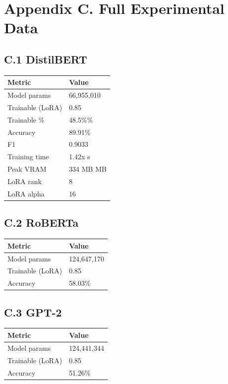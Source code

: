 \section{Appendix C. Full Experimental Data}

\subsection{C.1 DistilBERT}

\begin{table}[H]
\centering
\small
\begin{tabular}{ll}
\toprule
\textbf{Metric} & \textbf{Value} \\
\midrule
Model params & 66,955,010 \\
Trainable (LoRA) & 0.85 \\
Trainable \% & 48.5\%\% \\
Accuracy & 89.91\% \\
F1 & 0.9033 \\
Training time & 1.42x s \\
Peak VRAM & 334 MB MB \\
LoRA rank & 8 \\
LoRA alpha & 16 \\
\bottomrule
\end{tabular}
\end{table}

\subsection{C.2 RoBERTa}

\begin{table}[H]
\centering
\small
\begin{tabular}{ll}
\toprule
\textbf{Metric} & \textbf{Value} \\
\midrule
Model params & 124,647,170 \\
Trainable (LoRA) & 0.85 \\
Accuracy & 58.03\% \\
\bottomrule
\end{tabular}
\end{table}

\subsection{C.3 GPT-2}

\begin{table}[H]
\centering
\small
\begin{tabular}{ll}
\toprule
\textbf{Metric} & \textbf{Value} \\
\midrule
Model params & 124,441,344 \\
Trainable (LoRA) & 0.85 \\
Accuracy & 51.26\% \\
\bottomrule
\end{tabular}
\end{table}

